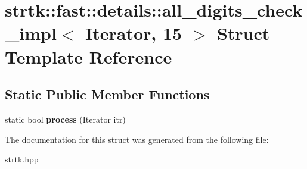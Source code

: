 \hypertarget{structstrtk_1_1fast_1_1details_1_1all__digits__check__impl_3_01Iterator_00_0115_01_4}{\section{strtk\-:\-:fast\-:\-:details\-:\-:all\-\_\-digits\-\_\-check\-\_\-impl$<$ Iterator, 15 $>$ Struct Template Reference}
\label{structstrtk_1_1fast_1_1details_1_1all__digits__check__impl_3_01Iterator_00_0115_01_4}
}
\subsection*{Static Public Member Functions}
\begin{DoxyCompactItemize}
\item 
\hypertarget{structstrtk_1_1fast_1_1details_1_1all__digits__check__impl_3_01Iterator_00_0115_01_4_ab7cabe3de7b7cf97afc8b44179322290}{static bool {\bfseries process} (Iterator itr)}\label{structstrtk_1_1fast_1_1details_1_1all__digits__check__impl_3_01Iterator_00_0115_01_4_ab7cabe3de7b7cf97afc8b44179322290}

\end{DoxyCompactItemize}


The documentation for this struct was generated from the following file\-:\begin{DoxyCompactItemize}
\item 
strtk.\-hpp\end{DoxyCompactItemize}

